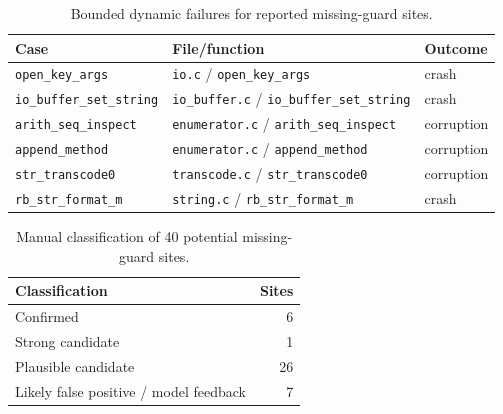 \begin{table}[t]
\caption{Bounded dynamic failures for reported missing-guard sites.}
\label{tab:dynamic-failures}
\centering
\scriptsize
\begin{tabular}{@{}lll@{}}
\toprule
Case & File/function & Outcome \\
\midrule
\texttt{open\_key\_args} & \texttt{io.c} / \texttt{open\_key\_args} & crash \\
\texttt{io\_buffer\_set\_string} & \texttt{io\_buffer.c} / \texttt{io\_buffer\_set\_string} & crash \\
\texttt{arith\_seq\_inspect} & \texttt{enumerator.c} / \texttt{arith\_seq\_inspect} & corruption \\
\texttt{append\_method} & \texttt{enumerator.c} / \texttt{append\_method} & corruption \\
\texttt{str\_transcode0} & \texttt{transcode.c} / \texttt{str\_transcode0} & corruption \\
\texttt{rb\_str\_format\_m} & \texttt{string.c} / \texttt{rb\_str\_format\_m} & crash \\
\bottomrule
\end{tabular}
\end{table}

\begin{table}[t]
\caption{Manual classification of 40 potential missing-guard sites.}
\label{tab:missing-classification}
\centering
\scriptsize
\begin{tabular}{@{}lr@{}}
\toprule
Classification & Sites \\
\midrule
Confirmed & 6 \\
Strong candidate & 1 \\
Plausible candidate & 26 \\
Likely false positive / model feedback & 7 \\
\bottomrule
\end{tabular}
\end{table}

